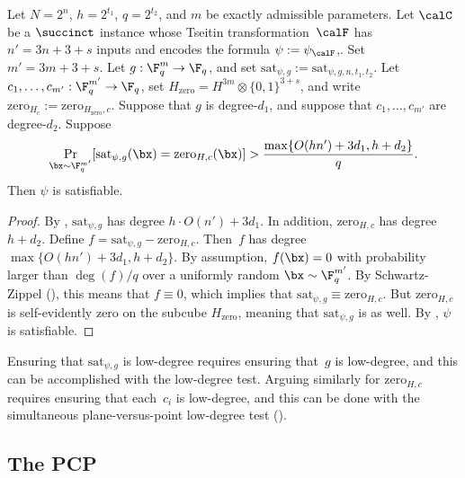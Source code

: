\begin{lemma}\label{lem:the-grand-finale}
Let $N=2^n$, $h = 2^{t_1}$, $q= 2^{t_2}$, and $m$ be exactly admissible parameters.
Let $\calC$ be a $\succinct$ instance whose Tseitin transformation~$\calF$
has $n' = 3n + 3 + s$ inputs and encodes the formula $\psi := \psi_{\calF}$,.
Set $m' = 3m + 3 + s$.
Let $g:\F_q^m \rightarrow \F_q$, and set $\mathrm{sat}_{\psi,g} := \mathrm{sat}_{\psi,g, n, t_1, t_2}$.
Let $c_1, \ldots, c_{m'}: \F_q^{m'} \rightarrow \F_q$, set $H_{\mathrm{zero}} = H^{3m} \otimes \{0, 1\}^{3 + s}$, and write $\mathrm{zero}_{H_c} := \mathrm{zero}_{H_{\mathrm{zero}},  c}$.
Suppose that $g$ is degree-$d_1$, and suppose that $c_1, \ldots, c_{m'}$ are degree-$d_2$.
Suppose
\begin{equation*}
\Pr_{\bx \sim \F_q^{m'}}[\mathrm{sat}_{\psi,g}(\bx) =  \mathrm{zero}_{H,c}(\bx)] > \frac{\max\{O(h n') + 3 d_1, h + d_2\}}{q}.
\end{equation*}
Then $\psi$ is satisfiable.
\end{lemma}
\begin{proof}
By ,
$\mathrm{sat}_{\psi, g}$ has degree $h \cdot O(n') + 3 d_1$.
In addition, $\mathrm{zero}_{H,c}$ has degree $h + d_2$.
Define $f = \mathrm{sat}_{\psi,g} -  \mathrm{zero}_{H,c}$.
Then~$f$ has degree $\max\{O(h n') + 3 d_1, h + d_2\}$.
By assumption, $f(\bx) = 0$ with probability larger than $\deg(f)/q$ over a uniformly random $\bx \sim \F_q^{m'}$.
By Schwartz-Zippel (), this means that $f \equiv 0$, which implies that $\mathrm{sat}_{\psi, g} \equiv \mathrm{zero}_{H,c}$.
But $\mathrm{zero}_{H,c}$ is self-evidently zero on the subcube $H_{\mathrm{zero}}$,
meaning that $\mathrm{sat}_{\psi,g}$ is as well.
By , $\psi$ is satisfiable.
\end{proof}

Ensuring that $\mathrm{sat}_{\psi,g}$ is low-degree requires ensuring that~$g$ is low-degree, and this can be accomplished with the low-degree test.
Arguing similarly for $\mathrm{zero}_{H,c}$ requires ensuring that each~$c_i$ is low-degree, and this can be done with the simultaneous plane-versus-point low-degree test ().

\subsection{The PCP}\label{sec:the-pcp}

